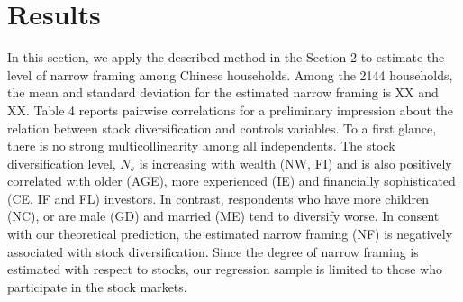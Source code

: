 \documentclass[ukenglish,nottitlepage,thmsb,11pt,letterpaper]{article}
\begin{document}
\section{Results}

In this section, we apply the described method  in the Section 2 to estimate the level of narrow framing among Chinese households. Among the 2144 households, the mean and standard deviation for the estimated narrow framing is XX and XX. Table 4 reports pairwise correlations for a preliminary impression about the relation between stock diversification and controls variables. To a first glance, there is no strong multicollinearity among all independents. The stock diversification level, $N_s$ is increasing with wealth (NW, FI) and is also positively correlated with older (AGE), more experienced  (IE) and financially sophisticated (CE, IF and FL) investors.  In contrast, respondents who have more children (NC),  or are male (GD) and married (ME) tend to diversify worse. In consent with our theoretical  prediction, the estimated narrow framing (NF) is negatively associated with stock diversification. Since the degree of narrow framing is estimated with respect to stocks, our regression sample is limited to those who participate in the stock markets.  
\end{document}
